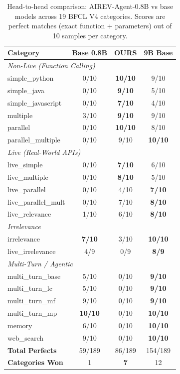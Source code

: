 \documentclass[10pt,twocolumn]{article}
\begin{document}
\begin{table}[!htbp]
\centering
\caption{Head-to-head comparison: AIREV-Agent-0.8B vs base models across 19 BFCL V4 categories. Scores are perfect matches (exact function + parameters) out of 10 samples per category.}
\label{tab:results}
\small
\begin{tabular}{lccc}
\toprule
\textbf{Category} & \textbf{Base 0.8B} & \textbf{OURS} & \textbf{9B Base} \\
\midrule
\multicolumn{4}{l}{\textit{Non-Live (Function Calling)}} \\
simple\_python & 0/10 & \textbf{10/10} & 9/10 \\
simple\_java & 0/10 & \textbf{9/10} & 5/10 \\
simple\_javascript & 0/10 & \textbf{7/10} & 4/10 \\
multiple & 3/10 & \textbf{9/10} & 9/10 \\
parallel & 0/10 & \textbf{10/10} & 8/10 \\
parallel\_multiple & 0/10 & 9/10 & \textbf{10/10} \\
\midrule
\multicolumn{4}{l}{\textit{Live (Real-World APIs)}} \\
live\_simple & 0/10 & \textbf{7/10} & 6/10 \\
live\_multiple & 0/10 & \textbf{8/10} & 5/10 \\
live\_parallel & 0/10 & 4/10 & \textbf{7/10} \\
live\_parallel\_mult & 0/10 & 7/10 & \textbf{8/10} \\
live\_relevance & 1/10 & 6/10 & \textbf{8/10} \\
\midrule
\multicolumn{4}{l}{\textit{Irrelevance}} \\
irrelevance & \textbf{7/10} & 3/10 & \textbf{10/10} \\
live\_irrelevance & 4/9 & 0/9 & \textbf{8/9} \\
\midrule
\multicolumn{4}{l}{\textit{Multi-Turn / Agentic}} \\
multi\_turn\_base & 5/10 & 0/10 & \textbf{9/10} \\
multi\_turn\_lc & 5/10 & 0/10 & \textbf{9/10} \\
multi\_turn\_mf & 9/10 & 0/10 & \textbf{9/10} \\
multi\_turn\_mp & \textbf{10/10} & 0/10 & \textbf{10/10} \\
memory & 6/10 & 0/10 & \textbf{10/10} \\
web\_search & 9/10 & 0/10 & \textbf{10/10} \\
\midrule
\textbf{Total Perfects} & 59/189 & 86/189 & 154/189 \\
\textbf{Categories Won} & 1 & \textbf{7} & 12 \\
\bottomrule
\end{tabular}
\end{table}
\end{document}
